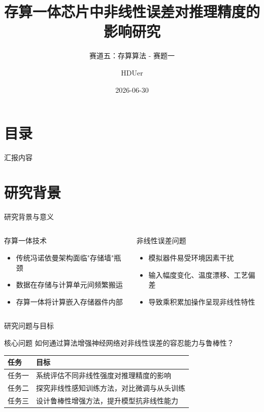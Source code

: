 \documentclass[aspectratio=169]{beamer}
\title[非线性误差对推理精度的影响研究]
{存算一体芯片中非线性误差对推理精度的影响研究}
\subtitle{赛道五：存算算法 - 赛题一}
\author{HDUer}
\date{2026-06-30}
\begin{document}
\frame{\titlepage}

\section{目录}
\begin{frame}{汇报内容}
\tableofcontents
\end{frame}

\section{研究背景}
\begin{frame}{研究背景与意义}
\begin{columns}
\begin{block}{存算一体技术}
\begin{itemize}
\item 传统冯诺依曼架构面临"存储墙"瓶颈
\item 数据在存储与计算单元间频繁搬运
\item 存算一体将计算嵌入存储器件内部
\end{itemize}
\end{block}
\begin{block}{非线性误差问题}
\begin{itemize}
\item 模拟器件易受环境因素干扰
\item 输入幅度变化、温度漂移、工艺偏差
\item 导致乘积累加操作呈现非线性特性
\end{itemize}
\end{block}
\end{columns}
\end{frame}

\begin{frame}{研究问题与目标}
\begin{block}{核心问题}
如何通过算法增强神经网络对非线性误差的容忍能力与鲁棒性？
\end{block}
\vfill
\begin{table}
\centering
\begin{tabular}{ll}
\toprule
\textbf{任务} & \textbf{目标} \\
\midrule
任务一 & 系统评估不同非线性强度对推理精度的影响 \\
任务二 & 探究非线性感知训练方法，对比微调与从头训练 \\
任务三 & 设计鲁棒性增强方法，提升模型抗非线性能力 \\
\bottomrule
\end{tabular}
\end{table}
\end{frame}
\end{document}
